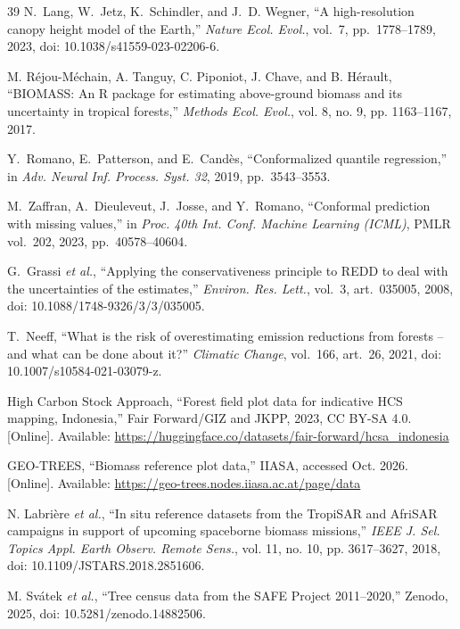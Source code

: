 \documentclass[conference,a4paper]{IEEEtran}
\begin{document}
\begin{thebibliography}{39}
N.~Lang, W.~Jetz, K.~Schindler, and J.~D. Wegner, ``A high-resolution canopy height model of the Earth,'' \textit{Nature Ecol. Evol.}, vol.~7, pp.~1778--1789, 2023, doi: 10.1038/s41559-023-02206-6.

M. R\'ejou-M\'echain, A. Tanguy, C. Piponiot, J. Chave, and B. H\'erault, ``BIOMASS: An R package for estimating above-ground biomass and its uncertainty in tropical forests,'' \textit{Methods Ecol. Evol.}, vol. 8, no. 9, pp. 1163--1167, 2017.

Y.~Romano, E.~Patterson, and E.~Cand\`es, ``Conformalized quantile regression,'' in \textit{Adv. Neural Inf. Process. Syst. 32}, 2019, pp.~3543--3553.

M.~Zaffran, A.~Dieuleveut, J.~Josse, and Y.~Romano, ``Conformal prediction with missing values,'' in \textit{Proc. 40th Int. Conf. Machine Learning (ICML)}, PMLR vol.~202, 2023, pp.~40578--40604.

G.~Grassi \textit{et al.}, ``Applying the conservativeness principle to REDD to deal with the uncertainties of the estimates,'' \textit{Environ. Res. Lett.}, vol.~3, art.~035005, 2008, doi: 10.1088/1748-9326/3/3/035005.

T.~Neeff, ``What is the risk of overestimating emission reductions from forests -- and what can be done about it?'' \textit{Climatic Change}, vol.~166, art.~26, 2021, doi: 10.1007/s10584-021-03079-z.

High Carbon Stock Approach, ``Forest field plot data for indicative HCS mapping, Indonesia,'' Fair Forward/GIZ and JKPP, 2023, CC BY-SA 4.0. [Online]. Available: \url{https://huggingface.co/datasets/fair-forward/hcsa_indonesia}

GEO-TREES, ``Biomass reference plot data,'' IIASA, accessed Oct. 2026. [Online]. Available: \url{https://geo-trees.nodes.iiasa.ac.at/page/data}

N. Labri\`ere \textit{et al.}, ``In situ reference datasets from the TropiSAR and AfriSAR campaigns in support of upcoming spaceborne biomass missions,'' \textit{IEEE J. Sel. Topics Appl. Earth Observ. Remote Sens.}, vol. 11, no. 10, pp. 3617--3627, 2018, doi: 10.1109/JSTARS.2018.2851606.

M. Sv\'atek \textit{et al.}, ``Tree census data from the SAFE Project 2011--2020,'' Zenodo, 2025, doi: 10.5281/zenodo.14882506.


\end{thebibliography}
\end{document}
